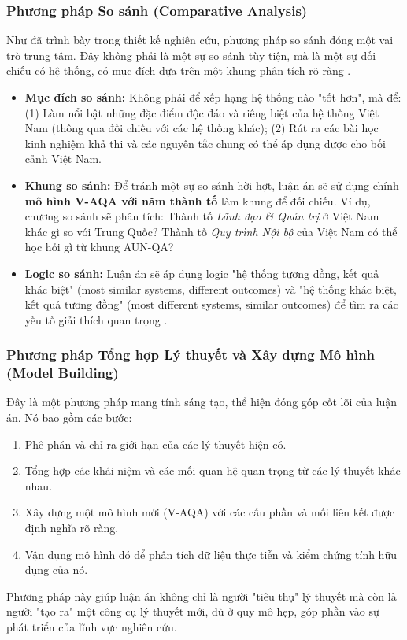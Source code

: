 \documentclass[12pt, a4paper, openany]{report}
\begin{document}
\subsubsection{Phương pháp So sánh (Comparative Analysis)}
\label{subsubsec:phan_tich_so_sanh}
Như đã trình bày trong thiết kế nghiên cứu, phương pháp so sánh đóng một vai trò trung tâm. Đây không phải là một sự so sánh tùy tiện, mà là một sự đối chiếu có hệ thống, có mục đích dựa trên một khung phân tích rõ ràng \cite{Sartori1991}.
\begin{itemize}
    \item \textbf{Mục đích so sánh:} Không phải để xếp hạng hệ thống nào "tốt hơn", mà để: (1) Làm nổi bật những đặc điểm độc đáo và riêng biệt của hệ thống Việt Nam (thông qua đối chiếu với các hệ thống khác); (2) Rút ra các bài học kinh nghiệm khả thi và các nguyên tắc chung có thể áp dụng được cho bối cảnh Việt Nam.
    \item \textbf{Khung so sánh:} Để tránh một sự so sánh hời hợt, luận án sẽ sử dụng chính \textbf{mô hình V-AQA với năm thành tố} làm khung để đối chiếu. Ví dụ, chương so sánh sẽ phân tích: Thành tố \textit{Lãnh đạo \& Quản trị} ở Việt Nam khác gì so với Trung Quốc? Thành tố \textit{Quy trình Nội bộ} của Việt Nam có thể học hỏi gì từ khung AUN-QA?
    \item \textbf{Logic so sánh:} Luận án sẽ áp dụng logic "hệ thống tương đồng, kết quả khác biệt" (most similar systems, different outcomes) và "hệ thống khác biệt, kết quả tương đồng" (most different systems, similar outcomes) để tìm ra các yếu tố giải thích quan trọng \cite{PrzeworskiTeune1970}.
\end{itemize}

\subsubsection{Phương pháp Tổng hợp Lý thuyết và Xây dựng Mô hình (Model Building)}
\label{subsubsec:xay_dung_mo_hinh}
Đây là một phương pháp mang tính sáng tạo, thể hiện đóng góp cốt lõi của luận án. Nó bao gồm các bước:
\begin{enumerate}
    \item Phê phán và chỉ ra giới hạn của các lý thuyết hiện có.
    \item Tổng hợp các khái niệm và các mối quan hệ quan trọng từ các lý thuyết khác nhau.
    \item Xây dựng một mô hình mới (V-AQA) với các cấu phần và mối liên kết được định nghĩa rõ ràng.
    \item Vận dụng mô hình đó để phân tích dữ liệu thực tiễn và kiểm chứng tính hữu dụng của nó.
\end{enumerate}
Phương pháp này giúp luận án không chỉ là người "tiêu thụ" lý thuyết mà còn là người "tạo ra" một công cụ lý thuyết mới, dù ở quy mô hẹp, góp phần vào sự phát triển của lĩnh vực nghiên cứu.
\end{document}
